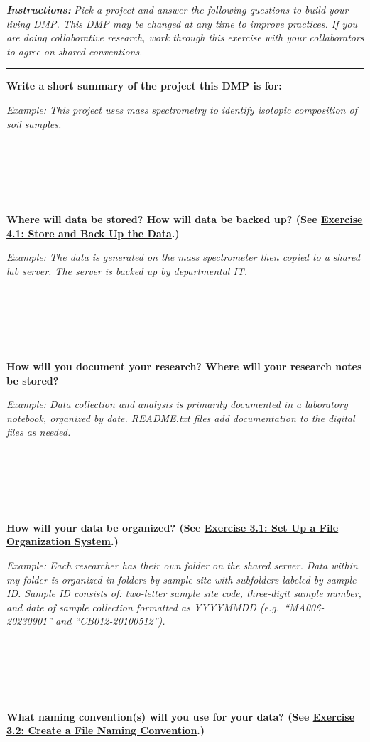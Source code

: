 \documentclass[
]{book}
\begin{document}
\textbf{\emph{Instructions:}} \emph{Pick a project and answer the following questions to build your living DMP. This DMP may be changed at any time to improve practices. If you are doing collaborative research, work through this exercise with your collaborators to agree on shared conventions.}

\begin{center}\rule{0.5\linewidth}{0.5pt}\end{center}

\textbf{Write a short summary of the project this DMP is for:}

\emph{Example: This project uses mass spectrometry to identify isotopic composition of soil samples.}

~

~

~

\textbf{Where will data be stored? How will data be backed up? (See \protect\hyperlink{storage}{Exercise 4.1: Store and Back Up the Data}.)}

\emph{Example: The data is generated on the mass spectrometer then copied to a shared lab server. The server is backed up by departmental IT.}

~

~

~

\textbf{How will you document your research? Where will your research notes be stored?}

\emph{Example: Data collection and analysis is primarily documented in a laboratory notebook, organized by date. README.txt files add documentation to the digital files as needed.}

~

~

~

\textbf{How will your data be organized? (See \protect\hyperlink{file-organization}{Exercise 3.1: Set Up a File Organization System}.)}

\emph{Example: Each researcher has their own folder on the shared server. Data within my folder is organized in folders by sample site with subfolders labeled by sample ID. Sample ID consists of: two-letter sample site code, three-digit sample number, and date of sample collection formatted as YYYYMMDD (e.g.~``MA006-20230901'' and ``CB012-20100512'').}

~

~

~

\textbf{What naming convention(s) will you use for your data? (See \protect\hyperlink{file-naming}{Exercise 3.2: Create a File Naming Convention}.)}
\end{document}
